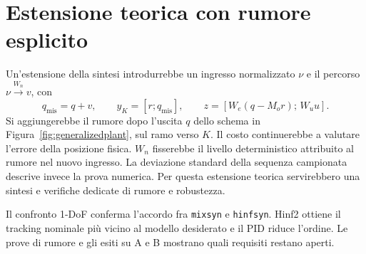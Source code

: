 \section{Estensione teorica con rumore esplicito}

Un'estensione della sintesi introdurrebbe un ingresso normalizzato
$\nu$ e il percorso $\nu\xrightarrow{W_n}v$, con
\[
 q_{\mathrm{mis}}=q+v,\qquad y_K=[r;q_{\mathrm{mis}}],\qquad
 z=[W_e(q-M_or);\,W_uu].
\]
Si aggiungerebbe il rumore dopo l'uscita $q$ dello schema in
Figura~\ref{fig:generalizedplant}, sul ramo verso $K$.
Il costo continuerebbe a valutare l'errore della posizione fisica.
$W_n$ fisserebbe il livello deterministico attribuito al rumore nel
nuovo ingresso. La deviazione standard della sequenza campionata
descrive invece la prova numerica. Per questa estensione teorica
servirebbero una sintesi e verifiche dedicate di rumore e robustezza.

Il confronto 1-DoF conferma l'accordo fra \texttt{mixsyn} e
\texttt{hinfsyn}. Hinf2 ottiene il tracking nominale più vicino al
modello desiderato e il PID riduce l'ordine. Le prove di rumore e
gli esiti su A e B mostrano quali requisiti restano aperti.
